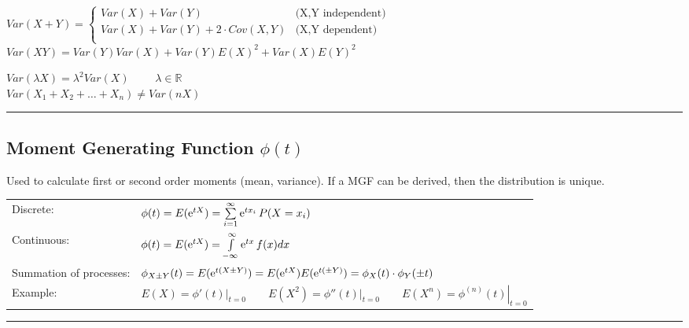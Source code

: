 \begin{minipage}{12cm}
    $Var(X+Y)= \begin{cases}
                  Var(X)+Var(Y)
                  & \text{(X,Y independent)}\\                     
                  Var(X) + Var(Y) + 2 \cdot Cov(X,Y) 
                  & \text{(X,Y dependent)}\\
               \end{cases} $ \\
    $Var(X Y)= Var(Y)Var(X)+Var(Y)E(X)^2+Var(X)E(Y)^2$
\end{minipage}
\begin{minipage}{7cm}
    $Var(\lambda X)=\lambda^2 Var(X) \qquad $ $\lambda \in
    \mathbb{R}$\\ 
    $Var(X_1+X_2+\ldots+X_n) \neq Var(n X)$ \\
\end{minipage}
\vspace{2mm}
\hrule
\vspace{3mm}

\subsection{Moment Generating Function $\phi(t)$ }
Used to calculate first or second order moments (mean, variance). If a MGF can be
derived, then the distribution is unique.

\begin{tabular}{p{5cm}p{12cm}}
Discrete: &$\phi(t)=E(\operatorname{\mathrm e}^{tX})=\sum\limits_{i=1}^\infty{\operatorname{\mathrm e}^{t x_i} P(X=x_i)}$\\
Continuous: &$\phi(t)=E(\operatorname{\mathrm e}^{tX})=\int\limits_{-\infty}^\infty{\operatorname{\mathrm e}^{t x} f(x)dx}$\\
Summation of processes: & $\phi_{X \pm Y}(t) = E(\operatorname{\mathrm e}^{t(X \pm Y)}) = E(\operatorname{\mathrm e}^{tX}) E(\operatorname{\mathrm e}^{t(\pm Y)})=\phi_{X}(t)\cdot\phi_Y(\pm t)$ \\
Example: &$E(X)=\left.\phi'(t)\right|_{t=0} \qquad E(X^2)=\left.\phi''(t)\right|_{t=0} \qquad E(X^n)=\left.\phi^{(n)}(t)\right|_{t=0}$
\end{tabular}

	\vspace{2mm}
	\hrule
	\vspace{3mm}
	


